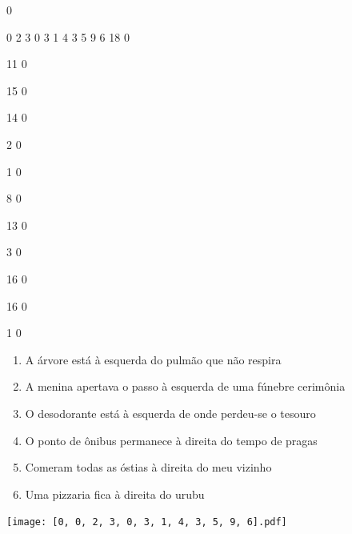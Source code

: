 \documentclass[12pt]{article}
\begin{document}
		\vfill  
		  
{
	0	%

	0	%
	2	%
	3	%
	0	%
	3	%
	1	%
	4	%
	3	%
	5	%
	9	%
	6	%
	18	%
	0	%

	11	%
	0	%

	15	%
	0	%

	14	%
	0	%

	2	%
	0	%

	1	%
	0	%

	8	%
	0	%

	13	%
	0	%

	3	%
	0	%

	16	%
	0	%

	16	%
	0	%

	1	%
	0	%

}	  
		    	

		 

\pagebreak


	\begin{enumerate}
		  \sffamily %
		  \large %


\vfill \item
A árvore está	%
à esquerda
do pulmão que não respira	%

\vfill \item
A menina apertava o passo	%
à esquerda
de uma fúnebre cerimônia	%

\vfill \item
O desodorante está	%
à esquerda
de onde perdeu-se o tesouro	%

\vfill \item
O ponto de ônibus permanece	%
à direita
do tempo de pragas	%

\vfill \item
Comeram todas as óstias	%
à direita
do meu vizinho	%

\vfill \item
Uma pizzaria fica	%
à direita
do urubu	%
	\end{enumerate}
		  
		  \hfill

		  \vfill

\texttt{[image: [0, 0, 2, 3, 0, 3, 1, 4, 3, 5, 9, 6].pdf]}
\end{document}
